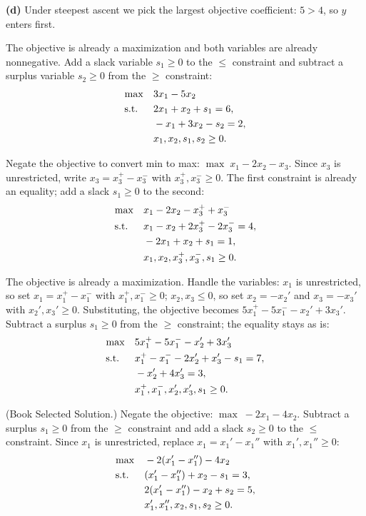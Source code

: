 \textbf{(d)} Under steepest ascent we pick the largest objective
coefficient: $5 > 4$, so $y$ enters first.


The objective is already a maximization and both variables are already
nonnegative. Add a slack variable $s_1 \geq 0$ to the $\leq$ constraint and
subtract a surplus variable $s_2 \geq 0$ from the $\geq$ constraint:
\[
\begin{aligned}
\max \quad & 3x_1 - 5x_2 \\
\text{s.t.}\;\; \quad & 2x_1 + x_2 + s_1 = 6, \\
& -x_1 + 3x_2 - s_2 = 2, \\
& x_1, x_2, s_1, s_2 \geq 0.
\end{aligned}
\]


Negate the objective to convert min to max: $\max\; x_1 - 2x_2 - x_3$.
Since $x_3$ is unrestricted, write $x_3 = x_3^+ - x_3^-$ with
$x_3^+, x_3^- \geq 0$. The first constraint is already an equality; add a
slack $s_1 \geq 0$ to the second:
\[
\begin{aligned}
\max \quad & x_1 - 2x_2 - x_3^+ + x_3^- \\
\text{s.t.}\;\; \quad & x_1 - x_2 + 2x_3^+ - 2x_3^- = 4, \\
& -2x_1 + x_2 + s_1 = 1, \\
& x_1, x_2, x_3^+, x_3^-, s_1 \geq 0.
\end{aligned}
\]


The objective is already a maximization. Handle the variables: $x_1$ is
unrestricted, so set $x_1 = x_1^+ - x_1^-$ with $x_1^+, x_1^- \geq 0$;
$x_2, x_3 \leq 0$, so set $x_2 = -x_2'$ and $x_3 = -x_3'$ with
$x_2', x_3' \geq 0$. Substituting, the objective becomes
$5x_1^+ - 5x_1^- - x_2' + 3x_3'$. Subtract a surplus $s_1 \geq 0$ from the
$\geq$ constraint; the equality stays as is:
\[
\begin{aligned}
\max \quad & 5x_1^+ - 5x_1^- - x_2' + 3x_3' \\
\text{s.t.}\;\; \quad & x_1^+ - x_1^- - 2x_2' + x_3' - s_1 = 7, \\
& -x_2' + 4x_3' = 3, \\
& x_1^+, x_1^-, x_2', x_3', s_1 \geq 0.
\end{aligned}
\]


(Book Selected Solution.) Negate the objective:
$\max\; -2x_1 - 4x_2$. Subtract a surplus $s_1 \geq 0$ from the $\geq$
constraint and add a slack $s_2 \geq 0$ to the $\leq$ constraint. Since
$x_1$ is unrestricted, replace $x_1 = x_1' - x_1''$ with
$x_1', x_1'' \geq 0$:
\[
\begin{aligned}
\max \quad & -2(x_1' - x_1'') - 4x_2 \\
\text{s.t.}\;\; \quad & (x_1' - x_1'') + x_2 - s_1 = 3, \\
& 2(x_1' - x_1'') - x_2 + s_2 = 5, \\
& x_1', x_1'', x_2, s_1, s_2 \geq 0.
\end{aligned}
\]

